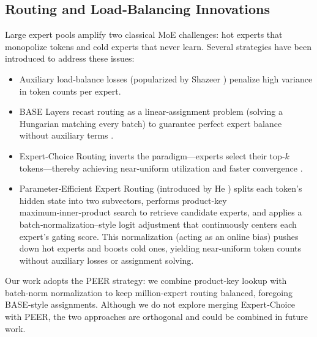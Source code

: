 \documentclass[12pt]{article}
\begin{document}
\subsection{Routing and Load‑Balancing Innovations}
Large expert pools amplify two classical MoE challenges: hot experts that monopolize tokens and cold experts that never learn. Several strategies have been introduced to address these issues:
\begin{itemize}
  \item Auxiliary load‑balance losses (popularized by Shazeer \cite{SparselyGatedMoE2017}) penalize high variance in token counts per expert.
  \item BASE Layers recast routing as a linear‑assignment problem (solving a Hungarian matching every batch) to guarantee perfect expert balance without auxiliary terms \cite{BASE2021}.
  \item Expert‑Choice Routing inverts the paradigm---experts select their top‑$k$ tokens---thereby achieving near‑uniform utilization and faster convergence \cite{ExpertChoiceRouting2022}.
  \item Parameter‑Efficient Expert Routing (introduced by He \cite{MillionExperts2024}) splits each token’s hidden state into two subvectors, performs product‑key maximum‑inner‑product search to retrieve candidate experts, and applies a batch‑normalization–style logit adjustment that continuously centers each expert’s gating score. This normalization (acting as an online bias) pushes down hot experts and boosts cold ones, yielding near‑uniform token counts without auxiliary losses or assignment solving.
\end{itemize}
Our work adopts the PEER strategy: we combine product‑key lookup with batch‑norm normalization to keep million‑expert routing balanced, foregoing BASE‑style assignments. Although we do not explore merging Expert‑Choice with PEER, the two approaches are orthogonal and could be combined in future work.
\end{document}
